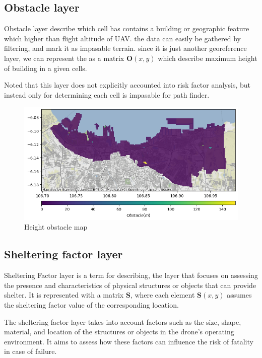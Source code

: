 \documentclass[12pt]{report}
\begin{document}
        \subsection{Obstacle layer}
            Obstacle layer describe which cell has contains a building or geographic feature which higher than flight
            altitude of UAV. the data can easily be gathered by filtering, and mark it as impasable terrain. since it is
            just another georeference layer, we can represent the as a matrix \(\mathbf{O}(x, y)\) which describe maximum height of
            building in a given cells.

            Noted that this layer does not explicitly accounted into risk factor analysis, but instead only for
            determining each cell is impasable for path finder.
            \begin{figure}[H]
                \centering
                \includegraphics[width=\textwidth]{Plot/obstacle.png}
                \caption{Height obstacle map}
            \end{figure}

        \subsection{Sheltering factor layer}
            Sheltering Factor layer is a term for describing, the layer that focuses on assessing the presence and
            characteristics of physical structures or objects that can provide shelter. It is represented with a matrix
            \textbf{S}, where each element \(\mathbf{S}(x, y)\) assumes the sheltering factor value of the corresponding
            location.

            The sheltering factor layer takes into account factors such as the size, shape, material, and location of
            the structures or objects in the drone's operating environment. It aims to assess how these factors can
            influence the risk of fatality in case of failure.
\end{document}
